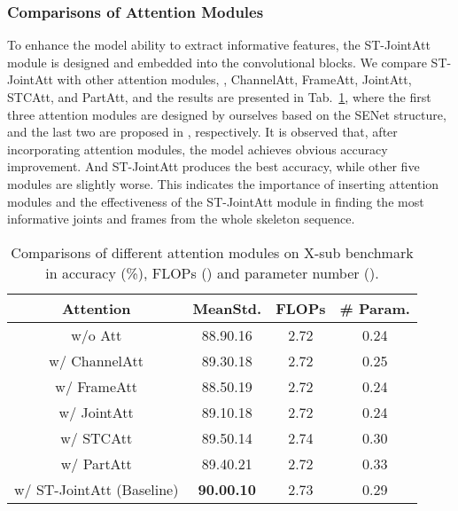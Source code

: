 \documentclass[10pt,journal,compsoc]{IEEEtran}
\begin{document}
\subsubsection{Comparisons of Attention Modules}
\label{sssec:compare_attention}

To enhance the model ability to extract informative features, the ST-JointAtt module is designed and embedded into the convolutional blocks. We compare ST-JointAtt with other attention modules, \ie, ChannelAtt, FrameAtt, JointAtt, STCAtt, and PartAtt, and the results are presented in Tab.~\ref{tab:attention}, where the first three attention modules are designed by ourselves based on the SENet \cite{hu2018squeeze} structure, and the last two are proposed in \cite{shi2020skeleton,song2020stronger}, respectively. It is observed that, after incorporating attention modules, the model achieves obvious accuracy improvement. And ST-JointAtt produces the best accuracy, while other five modules are slightly worse. This indicates the importance of inserting attention modules and the effectiveness of the ST-JointAtt module in finding the most informative joints and frames from the whole skeleton sequence.

\begin{table}[t]
  \caption{Comparisons of different attention modules on X-sub benchmark in accuracy (\%), FLOPs () and parameter number ().}
  \label{tab:attention}
  \vspace{-0.4cm}
  \centering
  \setlength{\tabcolsep}{4pt}
  \renewcommand{\arraystretch}{1.2}
  \begin{tabular}{c|ccc}
  \toprule
  Attention & MeanStd. & FLOPs & \# Param. \\
  \midrule
  w/o Att & 88.90.16 & 2.72 & 0.24 \\
  w/ ChannelAtt & 89.30.18 & 2.72 & 0.25 \\
  w/ FrameAtt & 88.50.19 & 2.72 & 0.24 \\
  w/ JointAtt & 89.10.18 & 2.72 & 0.24 \\
  w/ STCAtt \cite{shi2020skeleton} & 89.50.14 & 2.74 & 0.30 \\
  w/ PartAtt \cite{song2020stronger} & 89.40.21 & 2.72 & 0.33 \\
  w/ ST-JointAtt (Baseline) & {\bf 90.00.10} & 2.73 & 0.29 \\
  \bottomrule
  \end{tabular}
\end{table}
\end{document}

